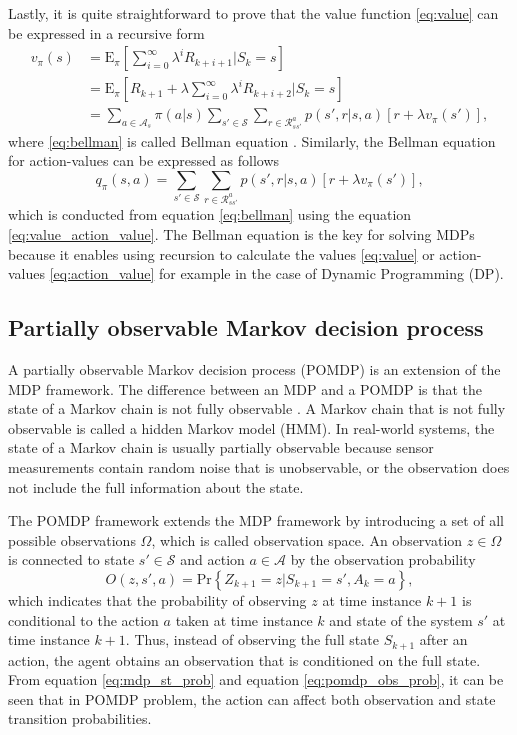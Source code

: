 \documentclass[english, 12pt, a4paper, elec, utf8, a-1b, online]{aaltothesis}
\newcommand{\Epolicy}[1]{\mathrm{E}_\pi \left[ #1 \right]}
\newcommand{\Ss}{\mathcal{S}}
\newcommand{\As}{\mathcal{A}}
\newcommand{\Rs}{\mathcal{R}}
\newcommand{\Os}{\Omega}
\newcommand{\Op}{O}
\renewcommand{\Pr}[1]{\text{Pr}\left\{ #1 \right\}}
\begin{document}
Lastly, it is quite straightforward to prove that the value function \eqref{eq:value} can be expressed in a recursive form 
\begin{align}
    v_\pi(s) 
    &= \Epolicy{ \sum_{i=0}^{\infty} \lambda^i R_{k + i + 1} | S_k=s} \\
    &= \Epolicy{R_{k + 1} + \lambda \sum_{i=0}^{\infty} \lambda^i R_{k + i + 2} | S_k=s} \\
    &= \sum_{a \in \As_s} \pi(a | s) \sum_{s' \in \Ss} \sum_{r \in \Rs_{ss'}^a} p(s', r | s, a) \left[ r + \lambda v_\pi(s') \right]\label{eq:bellman},
\end{align}
where \eqref{eq:bellman} is called Bellman equation \cite{Sutton2018}.
Similarly, the Bellman equation for action-values can be expressed as follows
\begin{equation}\label{eq:bellman_action}
     q_\pi(s, a) = \sum_{s' \in \Ss} \sum_{r \in \Rs_{ss'}^a} p(s', r | s, a) \left[ r + \lambda v_\pi(s') \right],
\end{equation}
which is conducted from equation \eqref{eq:bellman} using the equation \eqref{eq:value_action_value}.
The Bellman equation is the key for solving MDPs because it enables using recursion to calculate the values \eqref{eq:value} or action-values \eqref{eq:action_value} for example in the case of Dynamic Programming (DP).


\subsection{Partially observable Markov decision process} \label{sec:POMDP}


A partially observable Markov decision process (POMDP) is an extension of the MDP framework. 
The difference between an MDP and a POMDP is that the state of a Markov chain is not fully observable \cite{Krishnamurthy2016}.
A Markov chain that is not fully observable is called a hidden Markov model (HMM).
In real-world systems, the state of a Markov chain is usually partially observable because sensor measurements contain random noise that is unobservable, or the observation does not include the full information about the state.

The POMDP framework extends the MDP framework by introducing a set of all possible observations $\Os$, which is called observation space.
An observation $z \in \Os$ is connected to state $s' \in \Ss$ and action $a \in \As$ by the observation probability
\begin{equation}\label{eq:pomdp_obs_prob}
    \Op(z , s', a) = \Pr{Z_{k+1}=z | S_{k+1}=s', A_k=a},
\end{equation}
which indicates that the probability of observing $z$ at time instance $k+1$ is conditional to the action $a$ taken at time instance $k$ and state of the system $s'$ at time instance $k+1$.
Thus, instead of observing the full state $S_{k+1}$ after an action, the agent obtains an observation that is conditioned on the full state.
From equation \eqref{eq:mdp_st_prob} and equation \eqref{eq:pomdp_obs_prob}, it can be seen that in POMDP problem, the action can affect both observation and state transition probabilities.
\end{document}
